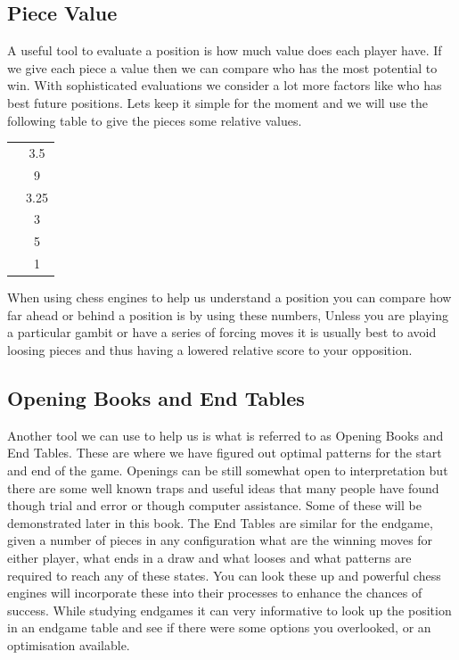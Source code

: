 \documentclass[11pt,a4paper]{book}
\begin{document}
\subsection*{Piece Value}

A useful tool to evaluate a position is how much value does each player have. If we give each piece a value then we can compare who has the most potential to win. With sophisticated evaluations we consider a lot more factors like who has best future positions. Lets keep it simple for the moment and we will use the following table to give the pieces some relative values.
\\

\begin{tabular}{ | c|c | }
	\hline
	\king & 3.5 \\
	\queen & 9 \\
	\bishop & 3.25 \\
	\knight & 3 \\
	\rook & 5 \\
	\pawn & 1 \\
	\hline
\end{tabular}
\begin{table}
	\vspace{-8em}
	
When using chess engines to help us understand a position you can compare how far ahead or behind a position is by using these numbers, Unless you are playing a particular gambit or have a series of forcing moves it is usually best to avoid loosing pieces and thus having a lowered relative score to your opposition.

\end{table}

\clearpage

\subsection*{Opening Books and End Tables}

Another tool we can use to help us is what is referred to as Opening Books and End Tables. These are where we have figured out optimal patterns for the start and end of the game. Openings can be still somewhat open to interpretation but there are some well known traps and useful ideas that many people have found though trial and error or though computer assistance. Some of these will be demonstrated later in this book. The End Tables are similar for the endgame, given a number of pieces in any configuration what are the winning moves for either player, what ends in a draw and what looses and what patterns are required to reach any of these states. You can look these up and powerful chess engines will incorporate these into their processes to enhance the chances of success. While studying endgames it can very informative to look up the position in an endgame table and see if there were some options you overlooked, or an optimisation available.
\end{document}
